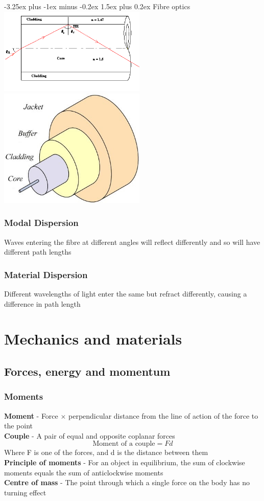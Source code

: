 \documentclass[12pt]{article}
\makeatletter
\renewcommand{\paragraph}{\@startsection{paragraph}{4}{0ex}%
    {-3.25ex plus -1ex minus -0.2ex}%
    {1.5ex plus 0.2ex}%
    {\normalfont\normalsize\bfseries}}
\makeatother
\begin{document}
\paragraph{Fibre optics}
\includegraphics[width=7cm]{Fibre_Optic_1.png}\\
\includegraphics[width=7cm]{Fibre_Optic_2.jpg}\\
\subsubsection{Modal Dispersion}
Waves entering the fibre at different angles will reflect differently and so will have different path lengths
\subsubsection{Material Dispersion}
Different wavelengths of light enter the same but refract differently, causing a difference in path length
\section{Mechanics and materials}
\subsection{Forces, energy and momentum}
\subsubsection{Moments}
\textbf{Moment} - Force $\times$ perpendicular distance from the line of action of the force to the point\\
\textbf{Couple} - A pair of equal and opposite coplanar forces
$$\textrm{Moment of a couple}=Fd$$
Where F is one of the forces, and d is the distance between them\\
\textbf{Principle of moments} - For an object in equilibrium, the sum of clockwise moments equals the sum of anticlockwise moments\\
\textbf{Centre of mass} - The point through which a single force on the body has no turning effect
\end{document}
